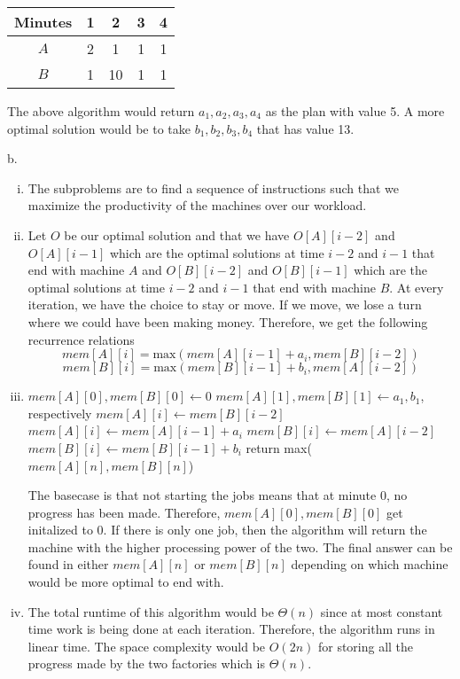 \documentclass[12pt]{article}
\begin{document}
\begin{center}
    \begin{tabular}{ |c|c|c|c|c| } 
      \hline
      Minutes & 1 & 2 & 3 & 4\\ 
      \hline
      $A$ & 2 & 1 & 1 & 1\\ 
      \hline
      $B$ & 1 & 10 & 1 & 1\\ 
      \hline
    \end{tabular}
\end{center}
The above algorithm would return $a_1,a_2,a_3,a_4$ as the plan with value 5. A more optimal solution would be to take $b_1,b_2,b_3,b_4$ that has value 13.

b.
\begin{enumerate}[i.]
    \item The subproblems are to find a sequence of instructions such that we maximize the productivity of the machines over our workload.
    \item Let $O$ be our optimal solution and that we have $O[A][i-2]$ and $O[A][i-1]$ which are the optimal solutions at time $i-2$ and $i-1$ that end with machine $A$ and $O[B][i-2]$ and $O[B][i-1]$ which are the optimal solutions at time $i-2$ and $i-1$ that end with machine $B$. At every iteration, we have the choice to stay or move. If we move, we lose a turn where we could have been making money. Therefore, we get the following recurrence relations $$mem[A][i]=\text{max}(mem[A][i-1] + a_i, mem[B][i-2])$$
    $$mem[B][i]=\text{max}(mem[B][i-1] + b_i, mem[A][i-2])$$
    \item 
    \begin{algorithmic}
            \State $mem[A][0], mem[B][0] \gets 0$
            \State $mem[A][1], mem[B][1] \gets a_1,b_1$, respectively
                \State $mem[A][i] \gets mem[B][i-2]$
            \Else
                \State $mem[A][i] \gets mem[A][i-1]+a_i$
            \EndIf
                \State $mem[B][i] \gets mem[A][i-2]$
            \Else
                \State $mem[B][i] \gets mem[B][i-1]+b_i$
            \EndIf
            \EndFor
            \State return max($mem[A][n],mem[B][n]$)
        \EndProcedure
    \end{algorithmic}
    The basecase is that not starting the jobs means that at minute 0, no progress has been made. Therefore, $mem[A][0], mem[B][0]$ get initalized to 0. If there is only one job, then the algorithm will return the machine with the higher processing power of the two. The final answer can be found in either $mem[A][n]$ or $mem[B][n]$ depending on which machine would be more optimal to end with.
    \item The total runtime of this algorithm would be $\Theta(n)$ since at most constant time work is being done at each iteration. Therefore, the algorithm runs in linear time. The space complexity would be $O(2n)$ for storing all the progress made by the two factories which is $\Theta(n)$.
\end{enumerate}
 

  
\end{document}
